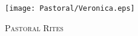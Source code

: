 \fancyhead[RE,LO]{}\fancyhead[RO,LE]{}
\fancyhead[C]{}\thispagestyle{empty}
{}

\begin{figure}[H]
    \centering
    \texttt{[image: Pastoral/Veronica.eps]}
    \caption{\textsc{\Huge{Pastoral Rites}}}
\end{figure}

